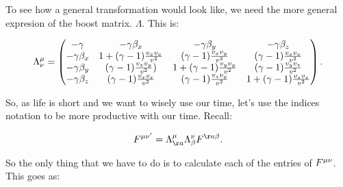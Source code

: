 To see how a general transformation would look like, we need the more general expresion of the boost matrix. $\Lambda$. This is:

\begin{equation}
	\Lambda^{\mu}_{\nu}= 
	\begin{pmatrix}
		-\gamma & -\gamma \beta_{x} & -\gamma \beta_{y} & -\gamma \beta_{z}\\
		-\gamma \beta_{x} &1+(\gamma-1)\tfrac{v_{x}v_{x}}{v^{2}} & (\gamma-1)\tfrac{v_{x}v_{y}}{v^{2}} & (\gamma-1)\tfrac{v_{x}v_{x}}{v^{2}}\\
		-\gamma \beta_{y}&  (\gamma-1)\tfrac{v_{x}v_{y}}{v^{2}})& 1+(\gamma-1)\tfrac{v_{y}v_{y}}{v^{2}} & (\gamma-1)\tfrac{v_{y}v_{z}}{v^{2}}\\
		-\gamma \beta_{z}  &(\gamma-1)\tfrac{v_{x}v_{z}}{v^{2}} & (\gamma-1)\tfrac{v_{z}v_{y}}{v^{2}}& 1+ (\gamma-1)\tfrac{v_{z}v_{z}}{v^{2}}\\
	\end{pmatrix}.
\end{equation}

So, as life is short and we want to wisely use our time, let's use the indices notation to be more productive with our time. Recall:

\begin{equation}
	F^{\m\n '} = \Lambda^{\m}_{\aa} \Lambda^{\n}_{\bt} F^{\aa\bt}.
\end{equation}

So the only thing that we have to do is to calculate each of the entries of $F^{\mu\nu }$. This goes as:


